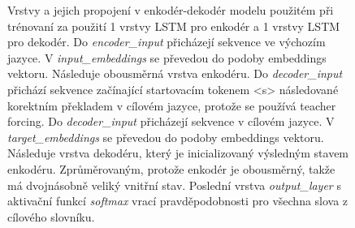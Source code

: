 \begin{figure}[H]
    \begin{center}
    \end{center}
	\caption{Vrstvy a jejich propojení v enkodér-dekodér modelu použitém při trénovaní za použití 1 vrstvy LSTM pro enkodér a 1 vrstvy LSTM pro dekodér. Do \emph{encoder\_input} přicházejí sekvence ve výchozím jazyce. V \emph{input\_embeddings} se převedou do podoby embeddings vektoru. Následuje obousměrná vrstva enkodéru. Do \emph{decoder\_input} přichází sekvence začínající startovacím tokenem <s> následované korektním překladem v cílovém jazyce, protože se používá teacher forcing. Do \emph{decoder\_input} přicházejí sekvence v cílovém jazyce. V \emph{target\_embeddings} se převedou do podoby embeddings vektoru. Následuje vrstva dekodéru, který je inicializovaný výsledným stavem enkodéru. Zprůměrovaným, protože enkodér je obousměrný, takže má dvojnásobně veliký vnitřní stav. Poslední vrstva \emph{output\_layer} s aktivační funkcí \emph{softmax} vrací pravděpodobnosti pro všechna slova z cílového slovníku.}
	\label{img:model}
\end{figure}


